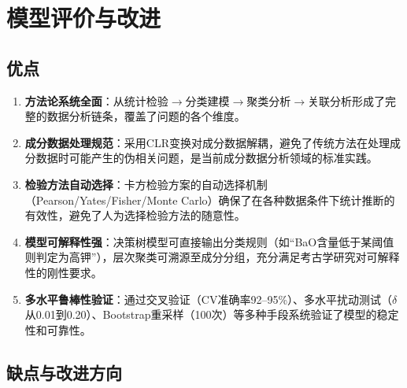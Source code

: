\documentclass[12pt,a4paper]{ctexart}
\begin{document}
\newpage

\section{模型评价与改进}

\subsection{优点}

\begin{enumerate}[label=(\arabic*), leftmargin=*]
    \item \textbf{方法论系统全面}：从统计检验$\rightarrow$分类建模$\rightarrow$聚类分析$\rightarrow$关联分析形成了完整的数据分析链条，覆盖了问题的各个维度。
    \item \textbf{成分数据处理规范}：采用CLR变换对成分数据解耦，避免了传统方法在处理成分数据时可能产生的伪相关问题，是当前成分数据分析领域的标准实践。
    \item \textbf{检验方法自动选择}：卡方检验方案的自动选择机制（Pearson/Yates/Fisher/Monte Carlo）确保了在各种数据条件下统计推断的有效性，避免了人为选择检验方法的随意性。
    \item \textbf{模型可解释性强}：决策树模型可直接输出分类规则（如“BaO含量低于某阈值则判定为高钾”），层次聚类可溯源至成分分组，充分满足考古学研究对可解释性的刚性要求。
    \item \textbf{多水平鲁棒性验证}：通过交叉验证（CV准确率92--95\%）、多水平扰动测试（$\delta$从0.01到0.20）、Bootstrap重采样（100次）等多种手段系统验证了模型的稳定性和可靠性。
\end{enumerate}

\subsection{缺点与改进方向}
\end{document}
